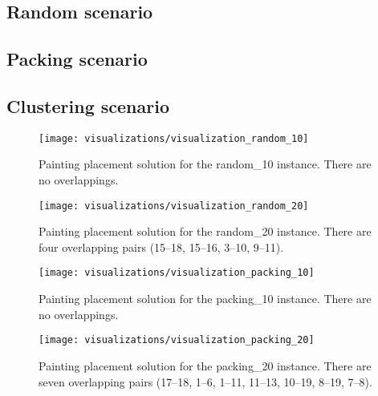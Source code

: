 \subsection{Random scenario}\label{subsec:random-scenario}

\subsection{Packing scenario}\label{subsec:packing-scenario}

\subsection{Clustering scenario}\label{subsec:clustering-scenario}

\begin{figure}[h!]
    \texttt{[image: visualizations/visualization\_random\_10]}
    \caption[Painting placement solution for the random\_10 instance]
        {Painting placement solution for the random\_10 instance.
    There are no overlappings.}
    \label{fig:results:visualization-random-10}
\end{figure}

\begin{figure}[h!]
    \texttt{[image: visualizations/visualization\_random\_20]}
    \caption[Painting placement solution for the random\_20 instance]
        {Painting placement solution for the random\_20 instance.
    There are four overlapping pairs (15–18, 15–16, 3–10, 9–11).}
    \label{fig:results:visualization-random-20}
\end{figure}

\begin{figure}[h!]
    \texttt{[image: visualizations/visualization\_packing\_10]}
    \caption[Painting placement solution for the packing\_10 instance]
        {Painting placement solution for the packing\_10 instance.
    There are no overlappings.}
    \label{fig:results:visualization-packing-10}
\end{figure}

\begin{figure}[h!]
    \texttt{[image: visualizations/visualization\_packing\_20]}
    \caption[Painting placement solution for the packing\_20 instance]
        {Painting placement solution for the packing\_20 instance.
    There are seven overlapping pairs (17–18, 1–6, 1–11, 11–13, 10–19, 8–19, 7–8).}
    \label{fig:results:visualization-packing-20}
\end{figure}

